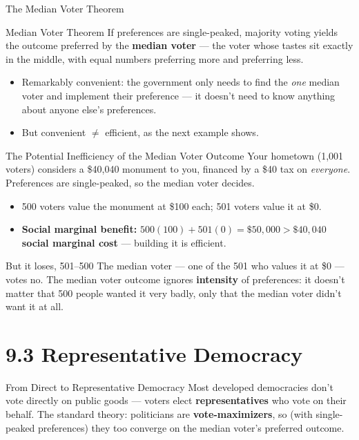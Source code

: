 \documentclass[11pt,aspectratio=169]{beamer}
\begin{document}
\begin{frame}{The Median Voter Theorem}
  \begin{block}{Median Voter Theorem}
    If preferences are single-peaked, majority voting yields the outcome preferred by the \textbf{median voter} --- the voter whose tastes sit exactly in the middle, with equal numbers preferring more and preferring less.
  \end{block}
  \begin{itemize}
    \item Remarkably convenient: the government only needs to find the \emph{one} median voter and implement their preference --- it doesn't need to know anything about anyone else's preferences.
    \item But convenient $\neq$ efficient, as the next example shows.
  \end{itemize}
\end{frame}

\begin{frame}{The Potential Inefficiency of the Median Voter Outcome}
  Your hometown (1,001 voters) considers a \$40,040 monument to you, financed by a \$40 tax on \emph{everyone}. Preferences are single-peaked, so the median voter decides.
  \begin{itemize}
    \item 500 voters value the monument at \$100 each; 501 voters value it at \$0.
    \item \textbf{Social marginal benefit:} $500(100) + 501(0) = \$50{,}000 > \$40{,}040$ \textbf{social marginal cost} --- building it is efficient.
  \end{itemize}
  \begin{alertblock}{But it loses, 501--500}
    The median voter --- one of the 501 who values it at \$0 --- votes no. The median voter outcome ignores \textbf{intensity} of preferences: it doesn't matter that 500 people wanted it very badly, only that the median voter didn't want it at all.
  \end{alertblock}
\end{frame}

\section{9.3 Representative Democracy}

\begin{frame}{From Direct to Representative Democracy}
  Most developed democracies don't vote directly on public goods --- voters elect \textbf{representatives} who vote on their behalf. The standard theory: politicians are \textbf{vote-maximizers}, so (with single-peaked preferences) they too converge on the median voter's preferred outcome.
\end{frame}
\end{document}
